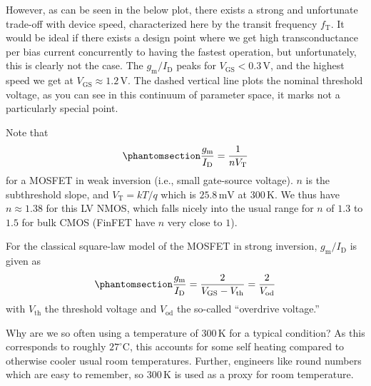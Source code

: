 \documentclass[
  a4paper,
  DIV=11,
  numbers=noendperiod]{scrartcl}
\begin{document}
However, as can be seen in the below plot, there exists a strong and
unfortunate trade-off with device speed, characterized here by the
transit frequency \(f_\mathrm{T}\). It would be ideal if there exists a
design point where we get high transconductance per bias current
concurrently to having the fastest operation, but unfortunately, this is
clearly not the case. The \(g_\mathrm{m}/I_\mathrm{D}\) peaks for
\(V_\mathrm{GS}< 0.3\,\text{V}\), and the highest speed we get at
\(V_\mathrm{GS}\approx 1.2\,\text{V}\). The dashed vertical line plots
the nominal threshold voltage, as you can see in this continuum of
parameter space, it marks not a particularly special point.

Note that
\begin{equation}\phantomsection\label{eq-mosfet-gmid-weakinversion}{
\frac{g_\mathrm{m}}{I_\mathrm{D}} = \frac{1}{n V_\mathrm{T}}
}\end{equation} for a MOSFET in weak inversion (i.e., small gate-source
voltage). \(n\) is the subthreshold slope, and
\(V_\mathrm{T} = k T / q\) which is \(25.8\,\text{mV}\) at
\(300\,\text{K}\). We thus have \(n \approx 1.38\) for this LV NMOS,
which falls nicely into the usual range for \(n\) of \(1.3\) to \(1.5\)
for bulk CMOS (FinFET have \(n\) very close to \(1\)).

For the classical square-law model of the MOSFET in strong inversion,
\(g_\mathrm{m}/I_\mathrm{D}\) is given as
\begin{equation}\phantomsection\label{eq-mosfet-gmid-stronginversion}{
\frac{g_\mathrm{m}}{I_\mathrm{D}} = \frac{2}{V_\mathrm{GS}- V_\mathrm{th}} = \frac{2}{V_\mathrm{od}} 
}\end{equation} with \(V_\mathrm{th}\) the threshold voltage and
\(V_\mathrm{od}\) the so-called ``overdrive voltage.''

\begin{tcolorbox}[enhanced jigsaw, breakable, title=\textcolor{quarto-callout-note-color}{\faInfo}\hspace{0.5em}{Why 300K?}, left=2mm, bottomrule=.15mm, opacitybacktitle=0.6, opacityback=0, colframe=quarto-callout-note-color-frame, leftrule=.75mm, bottomtitle=1mm, colbacktitle=quarto-callout-note-color!10!white, toprule=.15mm, rightrule=.15mm, toptitle=1mm, titlerule=0mm, arc=.35mm, colback=white, coltitle=black]

Why are we so often using a temperature of \(300\,\text{K}\) for a
typical condition? As this corresponds to roughly
\(27^{\circ}\text{C}\), this accounts for some self heating compared to
otherwise cooler usual room temperatures. Further, engineers like round
numbers which are easy to remember, so \(300\,\text{K}\) is used as a
proxy for room temperature.

\end{tcolorbox}
\end{document}

